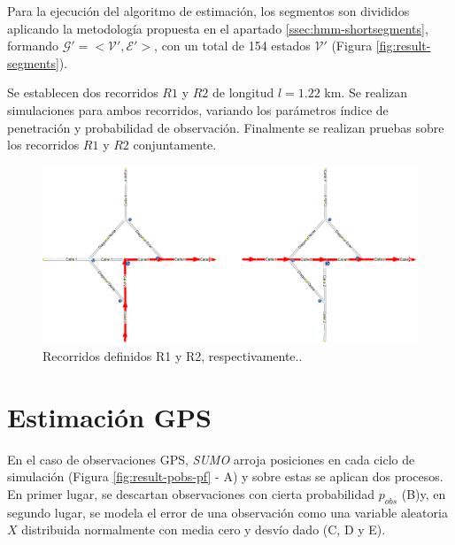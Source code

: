 Para la ejecución del algoritmo de estimación, los segmentos son divididos aplicando la metodología propuesta en el apartado \ref{ssec:hmm-shortsegments}, formando \(\mathcal{G'}=<\mathcal{V'},\mathcal{E'} >\), con un total de 154 estados $\mathcal{V'}$ (Figura \ref{fig:result-segments}).

Se establecen dos recorridos $R1$ y $R2$ de longitud $l=1.22$ km. Se realizan simulaciones para ambos recorridos, variando los parámetros índice de penetración y probabilidad de observación. Finalmente se realizan pruebas sobre los recorridos $R1$ y $R2$ conjuntamente.

\begin{figure}[!htp]
	\centering
	\includegraphics[width=0.9\linewidth]{images/result-r1r2.png}
	\captionsetup{width=0.8\linewidth}
	\caption{Recorridos definidos R1 y R2, respectivamente..}
    \label{fig:result-r1r2}
\end{figure}

\section{Estimación GPS}

En el caso de observaciones GPS, \textit{SUMO} arroja posiciones en cada ciclo de simulación (Figura \ref{fig:result-pobs-pf} - A) y sobre estas se aplican dos procesos. En primer lugar, se descartan observaciones con cierta probabilidad $p_{obs}$ (B)y, en segundo lugar, se modela el error de una observación como una variable aleatoria $X$ distribuida normalmente con media cero y desvío dado (C, D y E).

